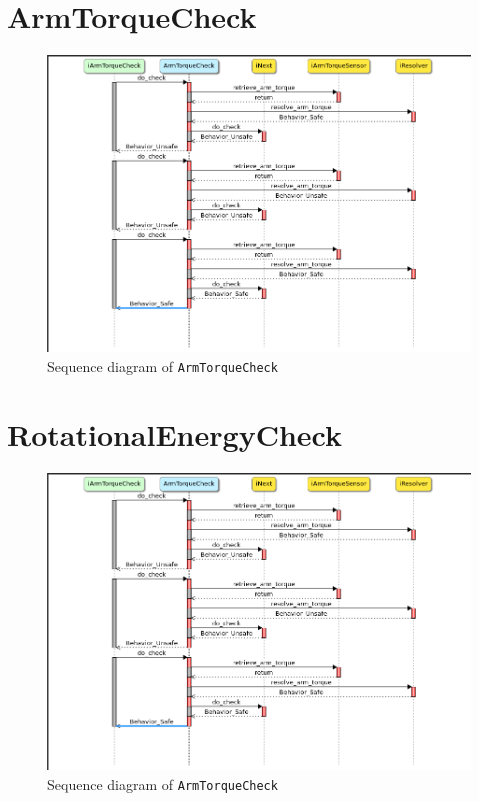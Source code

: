 \documentclass[12pt]{scrreprt}
\begin{document}
\begin{appendices}
\section{ArmTorqueCheck}
\label{aArmTorqueCheck}

\begin{figure}[H]
    \centering
    \includegraphics[width=\textwidth]{Figures/results/modelling_figures/ArmTorqueCheck/ArmTorqueCheck_seq.png}
    \caption{Sequence diagram of \texttt{ArmTorqueCheck}}
    \label{fig:ArmTorqueCheck_seq}
\end{figure}



\section{RotationalEnergyCheck}
\label{aRotationalEnergyCheck}

\begin{figure}[H]
    \centering
    \includegraphics[width=\textwidth]{Figures/results/modelling_figures/ArmTorqueCheck/ArmTorqueCheck_seq.png}
    \caption{Sequence diagram of \texttt{ArmTorqueCheck}}
    \label{fig:ArmTorqueCheck_seq}
\end{figure}




\end{appendices}
\end{document}
